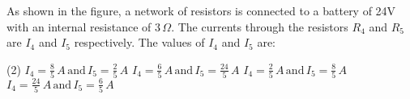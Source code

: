 \item As shown in the figure, a network of resistors is connected to a battery of 24V with an internal resistance of \(3 \, \Omega\). The currents through the resistors \(R_4\) and \(R_5\) are \(I_4\) and \(I_5\) respectively. The values of \(I_4\) and \(I_5\) are:
    \begin{center}
    \end{center}
    \begin{tasks}(2)
        \task \(I_4 = \frac{8}{5} \, A \, \text{and} \, I_5 = \frac{2}{5} \, A\)
        \task \(I_4 = \frac{6}{5} \, A \, \text{and} \, I_5 = \frac{24}{5} \, A\)
        \task \(I_4 = \frac{2}{5} \, A \, \text{and} \, I_5 = \frac{8}{5} \, A\)
        \task \(I_4 = \frac{24}{5} \, A \, \text{and} \, I_5 = \frac{6}{5} \, A\)
    \end{tasks}